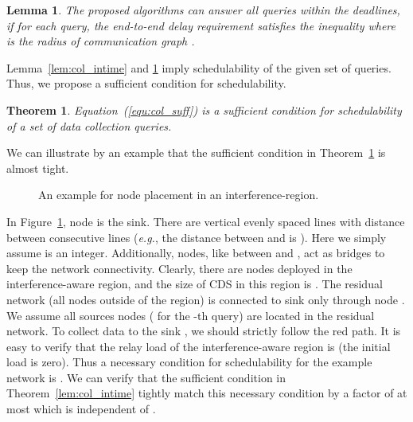 \documentclass[conference,10pt]{IEEEtran}\usepackage{amsmath}
\newtheorem{boldtheorem}{\textbf{Theorem}}
\newtheorem{lemma}{{Lemma}}
\def\eg{\textit{e.g.}\xspace}
\begin{document}
\begin{lemma}\label{lem:col_delay}
The proposed algorithms can answer all
queries within the deadlines,  if for each query, the end-to-end delay
 requirement   satisfies the inequality  where  is the radius of
communication graph .
\end{lemma}

Lemma~\ref{lem:col_intime} and \ref{lem:col_delay} imply
schedulability of the given set of queries. Thus, we propose a
sufficient condition for schedulability.
\begin{boldtheorem}\label{the:c_3}
Equation~(\ref{equ:col_suff}) is a sufficient condition for
schedulability of a set of data collection queries.
\end{boldtheorem}
We can illustrate by an example
 that the sufficient condition in Theorem~\ref{the:c_3} is almost tight.


 \begin{figure}[h]
\begin{center}
\caption{An example for node placement in an interference-region.}
\label{fig:col bound}
\end{center}
\end{figure}

In Figure~\ref{fig:col bound}, node  is the sink. There
are  vertical evenly spaced lines with
 distance  between consecutive lines
 (\eg, the distance between  and  is ).
 Here we simply assume  is an integer.
Additionally,  nodes, like  between  and , act
as
 bridges to keep the network connectivity.
Clearly, there are  nodes deployed in the
 interference-aware region, and the size of CDS in this region is
 .
The residual network (all nodes outside of the region)
 is connected to sink  only through node .
We assume all sources nodes ( for the -th query)
 are located in the residual network.
To collect data to the sink ,
 we should strictly follow the red path.
It is easy to verify that
 the relay load of the interference-aware region is   (the initial load is zero).
Thus a necessary condition for schedulability for the example
network
 is .
We can verify that the sufficient condition in
 Theorem~\ref{lem:col_intime}
tightly match this necessary condition
 by a factor of at most 
which is independent of .
\end{document}
